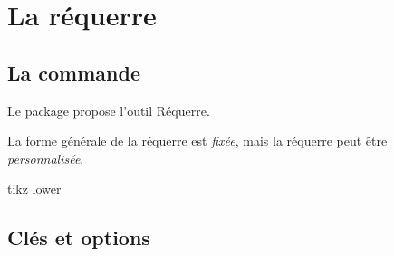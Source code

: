\documentclass[french,a4paper,11pt]{article}
\begin{document}
\pagebreak

\section{La réquerre}

\subsection{La commande}

\begin{cautionblock}
Le package propose l'outil \textsf{Réquerre}.

La forme générale de la réquerre est \textit{fixée}, mais la réquerre peut être \textit{personnalisée}.
\end{cautionblock}

\begin{PresentationCode}{tikz lower}
\tkzRequerre
\end{PresentationCode}

\subsection{Clés et options}
\end{document}
